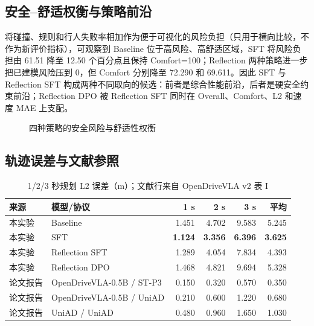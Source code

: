 \documentclass[UTF8,a4paper,12pt,fontset=fandol]{ctexart}
\begin{document}
\subsection{安全--舒适权衡与策略前沿}
将碰撞、规则和行人失败率相加作为便于可视化的风险负担（只用于横向比较，不作为新评价指标），可观察到 Baseline 位于高风险、高舒适区域，SFT 将风险负担由 61.51 降至 12.50 个百分点且保持 Comfort=100；Reflection 两种策略进一步把已建模风险压到 0，但 Comfort 分别降至 72.290 和 69.611。因此 SFT 与 Reflection SFT 构成两种不同取向的候选：前者是综合性能前沿，后者是硬安全约束前沿；Reflection DPO 被 Reflection SFT 同时在 Overall、Comfort、L2 和速度 MAE 上支配。

\begin{figure}[!htbp]
\centering
{}
\caption{四种策略的安全风险与舒适性权衡}
\end{figure}

\subsection{轨迹误差与文献参照}
\begin{table}[!htbp]
\centering\small
\caption{1/2/3 秒规划 L2 误差（m）；文献行来自 OpenDriveVLA v2 表 I}
\begin{tabular}{llrrrr}
\toprule
来源 & 模型/协议 & 1 s & 2 s & 3 s & 平均 \\
\midrule
本实验 & Baseline & 1.451 & 4.702 & 9.583 & 5.245 \\
本实验 & SFT & \textbf{1.124} & \textbf{3.356} & \textbf{6.396} & \textbf{3.625} \\
本实验 & Reflection SFT & 1.289 & 4.054 & 7.834 & 4.393 \\
本实验 & Reflection DPO & 1.468 & 4.821 & 9.694 & 5.328 \\
\midrule
论文报告 & OpenDriveVLA-0.5B / ST-P3 & 0.150 & 0.320 & 0.570 & 0.350 \\
论文报告 & OpenDriveVLA-0.5B / UniAD & 0.210 & 0.600 & 1.220 & 0.680 \\
论文报告 & UniAD / UniAD & 0.480 & 0.960 & 1.650 & 1.030 \\
\bottomrule
\end{tabular}
\end{table}
\end{document}

